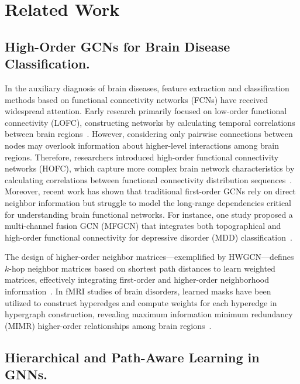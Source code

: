 \section{Related Work}
\subsection{High-Order GCNs for Brain Disease Classification.}

In the auxiliary diagnosis of brain diseases, feature extraction and classification methods based on functional connectivity networks (FCNs) have received widespread attention. Early research primarily focused on low-order functional connectivity (LOFC), constructing networks by calculating temporal correlations between brain regions~\cite{gupta2021obtaining,chen2016high}. However, considering only pairwise connections between nodes may overlook information about higher-level interactions among brain regions. Therefore, researchers introduced high-order functional connectivity networks (HOFC), which capture more complex brain network characteristics by calculating correlations between functional connectivity distribution sequences~\cite{zhang2016topographical,zhao2018diagnosis}. Moreover, recent work has shown that traditional first-order GCNs rely on direct neighbor information but struggle to model the long-range dependencies critical for understanding brain functional networks. For instance, one study proposed a multi-channel fusion GCN (MFGCN) that integrates both topographical and high-order functional connectivity for depressive disorder (MDD) classification~\cite{liu2024fusing}. 


The design of higher-order neighbor matrices—exemplified by HWGCN—defines $k$-hop neighbor matrices based on shortest path distances to learn weighted matrices, effectively integrating first-order and higher-order neighborhood information~\cite{liu2019higher}. In fMRI studies of brain disorders, learned masks have been utilized to construct hyperedges and compute weights for each hyperedge in hypergraph construction, revealing maximum information minimum redundancy (MIMR) higher-order relationships among brain regions~\cite{qiu2023learning}.



\vspace{-2mm}
\subsection{Hierarchical and Path-Aware Learning in GNNs.}

